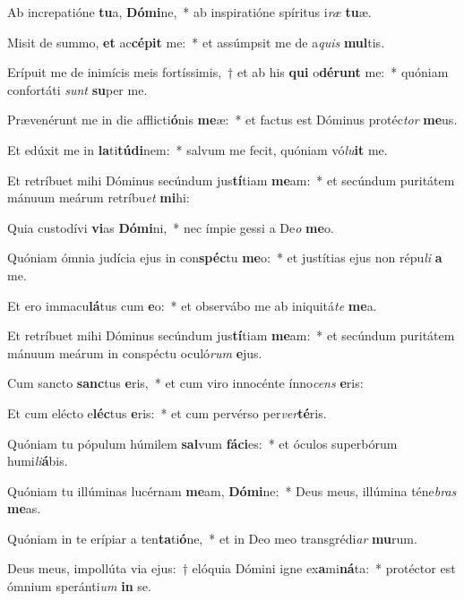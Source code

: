 \item Ab increpatióne \textbf{tu}a, \textbf{Dó}\textbf{mi}ne,~* ab inspiratióne spíritus i\textit{ræ} \textbf{tu}æ.
\item Misit de summo, \textbf{et} ac\textbf{cé}\textbf{pit} me:~* et assúmpsit me de a\textit{quis} \textbf{mul}tis.
\item Erípuit me de inimícis meis fortíssimis,~† et ab his \textbf{qui} o\textbf{dé}\textbf{runt} me:~* quóniam confortáti \textit{sunt} \textbf{su}per me.
\item Prævenérunt me in die afflicti\textbf{ó}nis \textbf{me}æ:~* et factus est Dóminus protéc\textit{tor} \textbf{me}us.
\item Et edúxit me in \textbf{la}ti\textbf{tú}\textbf{di}nem:~* salvum me fecit, quóniam vó\textit{lu}\textbf{it} me.
\item Et retríbuet mihi Dóminus secúndum jus\textbf{tí}tiam \textbf{me}am:~* et secúndum puritátem mánuum meárum retríbu\textit{et} \textbf{mi}hi:
\item Quia custodívi \textbf{vi}as \textbf{Dó}\textbf{mi}ni,~* nec ímpie gessi a De\textit{o} \textbf{me}o.
\item Quóniam ómnia judícia ejus in con\textbf{spéc}tu \textbf{me}o:~* et justítias ejus non répu\textit{li} \textbf{a} me.
\item Et ero immacu\textbf{lá}tus cum \textbf{e}o:~* et observábo me ab iniquitá\textit{te} \textbf{me}a.
\item Et retríbuet mihi Dóminus secúndum jus\textbf{tí}tiam \textbf{me}am:~* et secúndum puritátem mánuum meárum in conspéctu oculó\textit{rum} \textbf{e}jus.
\item Cum sancto \textbf{sanc}tus \textbf{e}ris,~* et cum viro innocénte ínno\textit{cens} \textbf{e}ris:
\item Et cum elécto e\textbf{léc}tus \textbf{e}ris:~* et cum pervérso per\textit{ver}\textbf{té}ris.
\item Quóniam tu pópulum húmilem \textbf{sal}vum \textbf{fá}\textbf{ci}es:~* et óculos superbórum humi\textit{li}\textbf{á}bis.
\item Quóniam tu illúminas lucérnam \textbf{me}am, \textbf{Dó}\textbf{mi}ne:~* Deus meus, illúmina téne\textit{bras} \textbf{me}as.
\item Quóniam in te erípiar a ten\textbf{ta}ti\textbf{ó}ne,~* et in Deo meo transgrédi\textit{ar} \textbf{mu}rum.
\item Deus meus, impollúta via ejus:~† elóquia Dómini igne ex\textbf{a}mi\textbf{ná}ta:~* protéctor est ómnium speránti\textit{um} \textbf{in} se.
